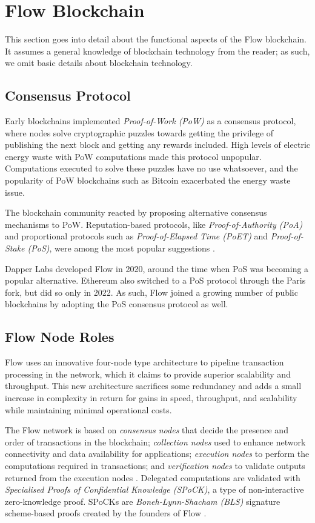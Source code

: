 \documentclass[../NFTComp_IEEE.tex]{subfiles}
\begin{document}
\section{Flow Blockchain}
\label{sec:flow_blockchain}
This section goes into detail about the functional aspects of the Flow blockchain. It assumes a general knowledge of blockchain technology from the reader; as such, we omit basic details about blockchain technology.

\subsection{Consensus Protocol}
Early blockchains implemented \textit{Proof-of-Work (PoW)} as a consensus protocol, where nodes solve cryptographic puzzles towards getting the privilege of publishing the next block and getting any rewards included. High levels of electric energy waste with PoW computations made this protocol unpopular. Computations executed to solve these puzzles have no use whatsoever, and the popularity of PoW blockchains such as Bitcoin exacerbated the energy waste issue.
\par
The blockchain community reacted by proposing alternative consensus mechanisms to PoW. Reputation-based protocols, like \textit{Proof-of-Authority (PoA)} and proportional protocols such as \textit{Proof-of-Elapsed Time (PoET)} and \textit{Proof-of-Stake (PoS)}, were among the most popular suggestions \cite{Bouraga2021}.
\par
Dapper Labs developed Flow in 2020, around the time when PoS was becoming a popular alternative. Ethereum also switched to a PoS protocol through the Paris fork, but did so only in 2022. As such, Flow joined a growing number of public blockchains by adopting the PoS consensus protocol as well.

\subsection{Flow Node Roles}
Flow uses an innovative four-node type architecture to pipeline transaction processing in the network, which it claims to provide superior scalability and throughput. This new architecture sacrifices some redundancy and adds a small increase in complexity in return for gains in speed, throughput, and scalability while maintaining minimal operational costs.
\par
The Flow network is based on \textit{consensus nodes} that decide the presence and order of transactions in the blockchain; \textit{collection nodes} used to enhance network connectivity and data availability for applications; \textit{execution nodes} to perform the computations required in transactions; and \textit{verification nodes} to validate outputs returned from the execution nodes \cite{Hentschel2019b}. Delegated computations are validated with \textit{Specialised Proofs of Confidential Knowledge (SPoCK)}, a type of non-interactive zero-knowledge proof. SPoCKs are \textit{Boneh-Lynn-Shacham (BLS)} signature scheme-based proofs created by the founders of Flow \cite{Ben2020}.
\end{document}
